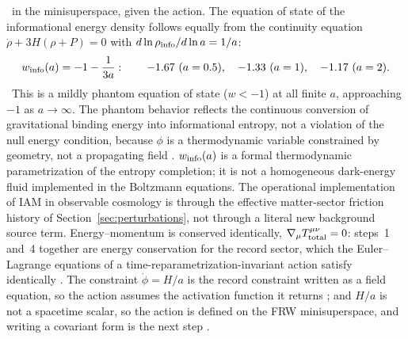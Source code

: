 \derived\ in the minisuperspace, given the action. The equation of state of the informational energy density follows equally from the continuity equation
$\dot\rho+3H(\rho+P)=0$ with $d\ln\rho_{\rm info}/d\ln a=1/a$:
\begin{equation}
w_{\rm info}(a)=-1-\frac{1}{3a}:\qquad -1.67\ (a=0.5),\quad -1.33\ (a=1),\quad -1.17\ (a=2). \label{eq:law_winfo}
\end{equation}
\derived\ This is a mildly phantom equation of state ($w<-1$) at all finite $a$, approaching $-1$ as $a\to\infty$. The phantom behavior reflects the
continuous conversion of gravitational binding energy into informational entropy, not a violation of the null energy condition, because $\phi$ is a
thermodynamic variable constrained by geometry, not a propagating field \interp. $w_{\rm info}(a)$ is a formal thermodynamic parametrization of the entropy
completion; it is not a homogeneous dark-energy fluid implemented in the Boltzmann equations. The operational implementation of IAM in observable cosmology
is through the effective matter-sector friction history of Section~\ref{sec:perturbations}, not through a literal new background source term.
Energy--momentum is conserved identically, $\nabla_\mu T^{\mu\nu}_{\rm total}=0$: steps~1 and~4 together are energy conservation for the record sector, which
the Euler--Lagrange equations of a time-reparametrization-invariant action satisfy identically \derived. The constraint $\dot\phi=H/a$ is the record
constraint written as a field equation, so the action assumes the activation function it returns \conjecture; and $H/a$ is not a spacetime scalar, so the
action is defined on the FRW minisuperspace, and writing a covariant form is the next step \openprob.

